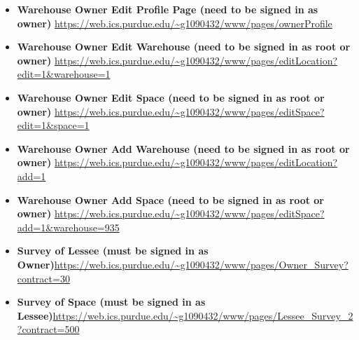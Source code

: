 \begin{itemize}
\item \textbf{Warehouse Owner Edit Profile Page (need to be signed in as owner)} \url {https://web.ics.purdue.edu/~g1090432/www/pages/ownerProfile}
\item \textbf{Warehouse Owner Edit Warehouse (need to be signed in as root or owner)} \url{https://web.ics.purdue.edu/~g1090432/www/pages/editLocation?edit=1&warehouse=1}
\item \textbf{Warehouse Owner Edit Space (need to be signed in as root or owner)} \url{https://web.ics.purdue.edu/~g1090432/www/pages/editSpace?edit=1&space=1}
\item \textbf{Warehouse Owner Add Warehouse (need to be signed in as root or owner)} \url {https://web.ics.purdue.edu/~g1090432/www/pages/editLocation?add=1}
\item \textbf{Warehouse Owner Add Space (need to be signed in as root or owner)} \url{https://web.ics.purdue.edu/~g1090432/www/pages/editSpace?add=1&warehouse=935}
\item \textbf{Survey of Lessee (must be signed in as Owner)}\url{https://web.ics.purdue.edu/~g1090432/www/pages/Owner_Survey?contract=30}
\item \textbf{Survey of Space (must be signed in as Lessee)}\url{https://web.ics.purdue.edu/~g1090432/www/pages/Lessee_Survey_2?contract=500}
\end{itemize}

